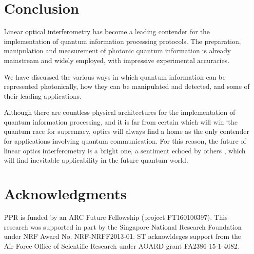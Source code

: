 \documentclass[times,final]{elsarticle}
\begin{document}
\section{Conclusion}

Linear optical interferometry has become a leading contender for the implementation of quantum information processing protocols. The preparation, manipulation and measurement of photonic quantum information is already mainstream and widely employed, with impressive experimental accuracies.

We have discussed the various ways in which quantum information can be represented photonically, how they can be manipulated and detected, and some of their leading applications.

Although there are countless physical architectures for the implementation of quantum information processing, and it is far from certain which will win `the quantum race for supremacy, optics will always find a home as the only contender for applications involving quantum communication. For this reason, the future of linear optics interferometry is a bright one, a sentiment echoed by others \cite{bib:Rudolph17}, which will find inevitable applicability in the future quantum world.

%
%

\section*{Acknowledgments}
PPR is funded by an ARC Future Fellowship (project FT160100397). This research was supported in part by the Singapore National Research Foundation under NRF Award No. NRF-NRFF2013-01. ST acknowldeges support from the Air Force Office of Scientific Research under AOARD grant FA2386-15-1-4082.

%
%





\end{document}
